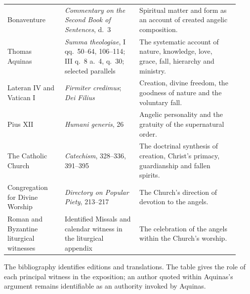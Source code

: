 \begin{longtable}{@{}>{\raggedright\arraybackslash}p{0.23\linewidth}>{\raggedright\arraybackslash}p{0.30\linewidth}>{\raggedright\arraybackslash}p{0.40\linewidth}@{}}
Bonaventure & \emph{Commentary on the Second Book of Sentences}, d.~3 &
Spiritual matter and form as an account of created angelic composition.\\
Thomas Aquinas & \emph{Summa theologiae}, I qq.~50--64, 106--114;
III q.~8 a.~4, q.~30; selected parallels & The systematic account of nature,
knowledge, love, grace, fall, hierarchy and ministry.\\
Lateran IV and Vatican I & \emph{Firmiter credimus}; \emph{Dei Filius} &
Creation, divine freedom, the goodness of nature and the voluntary fall.\\
Pius XII & \emph{Humani generis}, 26 & Angelic personality and the
gratuity of the supernatural order.\\
The Catholic Church & \emph{Catechism}, 328--336, 391--395 & The doctrinal
synthesis of creation, Christ's primacy, guardianship and fallen spirits.\\
Congregation for Divine Worship & \emph{Directory on Popular Piety}, 213--217 &
The Church's direction of devotion to the angels.\\
Roman and Byzantine liturgical witnesses & Identified Missals and calendar
witness in the liturgical appendix & The celebration of the angels within
the Church's worship.\\
\bottomrule
\end{longtable}

The bibliography identifies editions and translations. The table gives the
role of each principal witness in the exposition; an author quoted within
Aquinas's argument remains identifiable as an authority invoked by Aquinas.
